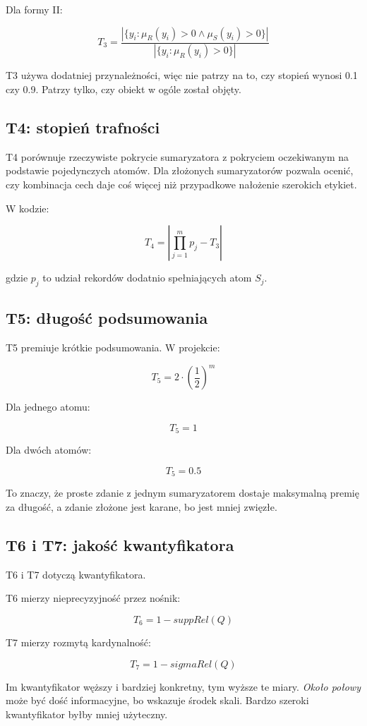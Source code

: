 \documentclass[11pt,a4paper]{article}
\begin{document}
Dla formy II:

\[
T_3 = \frac{|\{y_i : \mu_R(y_i)>0 \land \mu_S(y_i)>0\}|}
{|\{y_i : \mu_R(y_i)>0\}|}
\]

T3 używa dodatniej przynależności, więc nie patrzy na to, czy stopień wynosi 0.1 czy 0.9. Patrzy tylko, czy obiekt w ogóle został objęty.

\subsection{T4: stopień trafności}

T4 porównuje rzeczywiste pokrycie sumaryzatora z pokryciem oczekiwanym na podstawie pojedynczych atomów. Dla złożonych sumaryzatorów pozwala ocenić, czy kombinacja cech daje coś więcej niż przypadkowe nałożenie szerokich etykiet.

W kodzie:

\[
T_4 = \left|\prod_{j=1}^{m} p_j - T_3\right|
\]

gdzie \(p_j\) to udział rekordów dodatnio spełniających atom \(S_j\).

\subsection{T5: długość podsumowania}

T5 premiuje krótkie podsumowania. W projekcie:

\[
T_5 = 2 \cdot \left(\frac{1}{2}\right)^m
\]

Dla jednego atomu:

\[
T_5 = 1
\]

Dla dwóch atomów:

\[
T_5 = 0.5
\]

To znaczy, że proste zdanie z jednym sumaryzatorem dostaje maksymalną premię za długość, a zdanie złożone jest karane, bo jest mniej zwięzłe.

\subsection{T6 i T7: jakość kwantyfikatora}

T6 i T7 dotyczą kwantyfikatora.

T6 mierzy nieprecyzyjność przez nośnik:

\[
T_6 = 1 - suppRel(Q)
\]

T7 mierzy rozmytą kardynalność:

\[
T_7 = 1 - sigmaRel(Q)
\]

Im kwantyfikator węższy i bardziej konkretny, tym wyższe te miary. \emph{Około połowy} może być dość informacyjne, bo wskazuje środek skali. Bardzo szeroki kwantyfikator byłby mniej użyteczny.
\end{document}
